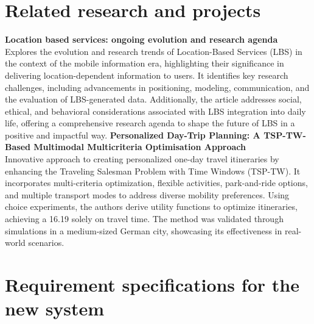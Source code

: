 \section{Related research and projects}
\noindent
\textbf{Location based services: ongoing evolution and research agenda} \\
\noindent
Explores the evolution and research trends of Location-Based Services (LBS) in the context of
the mobile information era, highlighting their significance in delivering location-dependent
information to users. It identifies key research challenges, including advancements in
positioning, modeling, communication, and the evaluation of LBS-generated data. Additionally,
the article addresses social, ethical, and behavioral considerations associated with LBS
integration into daily life, offering a comprehensive research agenda to shape the future of LBS
in a positive and impactful way.
\newpage
\noindent
\textbf{Personalized Day-Trip Planning: A TSP-TW-Based Multimodal Multicriteria Optimisation
Approach} \\
Innovative approach to creating personalized one-day travel itineraries by enhancing the
Traveling Salesman Problem with Time Windows (TSP-TW). It incorporates multi-criteria
optimization, flexible activities, park-and-ride options, and multiple transport modes to address
diverse mobility preferences. Using choice experiments, the authors derive utility functions to
optimize itineraries, achieving a 16.19%
solely on travel time. The method was validated through simulations in a medium-sized German
city, showcasing its effectiveness in real-world scenarios.
\section{Requirement specifications for the new system}
